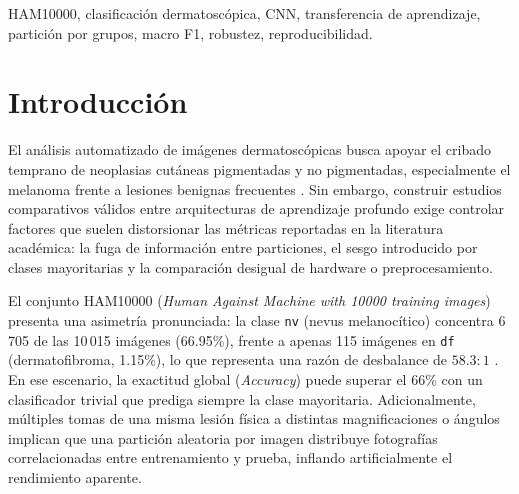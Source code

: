 \documentclass[conference]{IEEEtran}
\begin{document}
\begin{IEEEkeywords}
HAM10000, clasificaci\'on dermatosc\'opica, CNN, transferencia de aprendizaje, partici\'on por grupos, macro F1, robustez, reproducibilidad.
\end{IEEEkeywords}

\section{Introducci\'on}
El an\'alisis automatizado de im\'agenes dermatosc\'opicas busca apoyar el cribado temprano de neoplasias cut\'aneas pigmentadas y no pigmentadas, especialmente el melanoma frente a lesiones benignas frecuentes \cite{tschandl2018,codella2019}. Sin embargo, construir estudios comparativos v\'alidos entre arquitecturas de aprendizaje profundo exige controlar factores que suelen distorsionar las m\'etricas reportadas en la literatura acad\'emica: la fuga de informaci\'on entre particiones, el sesgo introducido por clases mayoritarias y la comparaci\'on desigual de hardware o preprocesamiento.

El conjunto HAM10000 (\textit{Human Against Machine with 10000 training images}) presenta una asimetr\'ia pronunciada: la clase \texttt{nv} (nevus melanoc\'itico) concentra 6\,705 de las 10\,015 im\'agenes (66.95\%), frente a apenas 115 im\'agenes en \texttt{df} (dermatofibroma, 1.15\%), lo que representa una raz\'on de desbalance de $58.3:1$ \cite{tschandl2018}. En ese escenario, la exactitud global (\textit{Accuracy}) puede superar el 66\% con un clasificador trivial que prediga siempre la clase mayoritaria. Adicionalmente, m\'ultiples tomas de una misma lesi\'on f\'isica a distintas magnificaciones o \'angulos implican que una partici\'on aleatoria por imagen distribuye fotograf\'ias correlacionadas entre entrenamiento y prueba, inflando artificialmente el rendimiento aparente.
\end{document}
